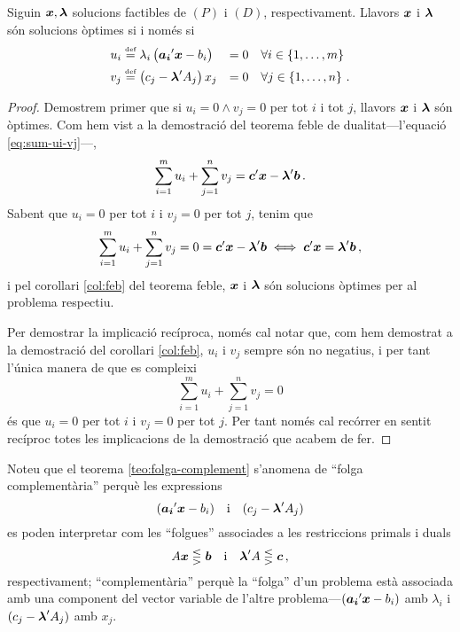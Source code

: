 \begin{teo}\label{teo:folga-complement}
	Siguin $\boldsymbol{x}, \boldsymbol{\lambda}$ solucions factibles de $\left(P\right)$ i
	$\left(D\right)$, respectivament. Llavors $\boldsymbol{x}$ i $\boldsymbol{\lambda}$ són
	solucions òptimes si i només si
	\begin{alignat*}{2}{}
	u_i &\stackrel{\text{\tiny def}}{=} \lambda_i \left(\boldsymbol{a_i}'\boldsymbol{x} - b_i\right) &= 0 &\quad
	\forall i \in \left\{1, \dots, m\right\} \\
	v_j &\stackrel{\text{\tiny def}}{=} \left(c_j - \boldsymbol{\lambda}'A_j\right) x_j &= 0 &\quad \forall
	j \in \left\{1, \dots, n\right\}\,.
	\end{alignat*}
	\begin{proof}
		Demostrem primer que si $u_i = 0 \land v_j = 0$ per tot $i$ i tot $j$,
		llavors $\boldsymbol{x}$ i $\boldsymbol{\lambda}$ són òptimes. Com hem vist a la 
		demostració del
		teorema feble de dualitat---l'equació \eqref{eq:sum-ui-vj}---, 
		\begin{equation*}
		\sum_{i = 1}^{m} u_i + \sum_{j = 1}^{n} v_j = \boldsymbol{c}'\boldsymbol{x} -
		\boldsymbol{\lambda}'\boldsymbol{b}\,.
		\end{equation*}
		Sabent que $u_i = 0$ per tot $i$ i $v_j = 0$ per tot $j$, tenim que
		\[\sum_{i = 1}^{m} u_i + \sum_{j = 1}^{n} v_j = 0 = \boldsymbol{c}'\boldsymbol{x} -
		\boldsymbol{\lambda}'\boldsymbol{b} \iff \boldsymbol{c}'\boldsymbol{x} = \boldsymbol{\lambda}'\boldsymbol{b}\,,  \] i 
		pel
		corol\lgem lari \ref{col:feb} del teorema feble, $\boldsymbol{x}$ i 
		$\boldsymbol{\lambda}$ 
		són
		solucions òptimes per al problema respectiu.
		
		Per demostrar la implicació recíproca, només cal notar que, com hem
		demostrat a la demostració del corol\lgem lari \ref{col:feb}, $u_i$ i 
		$v_j$ 
		sempre
		són no negatius, i per tant l'única manera de que es compleixi 
		\[\sum_{i=1}^{m}
		u_i + \sum_{j=1}^{n} v_j = 0 \] és que $u_i = 0$ per tot $i$ i $v_j = 
		0$ per tot
		$j$. Per tant només cal recórrer en sentit recíproc totes les 
		implicacions de la
		demostració que acabem de fer.
	\end{proof}
\end{teo}

Noteu que el teorema \ref{teo:folga-complement} s'anomena de ``folga
complementària'' perquè les expressions \[(\boldsymbol{a_i}'\boldsymbol{x}-b_i) \quad
\text{i}\quad (c_j-\boldsymbol{\lambda}'A_j) \] es poden interpretar com les ``folgues''
associades a les restriccions primals i duals \[A\boldsymbol{x} \lesseqgtr \boldsymbol{b} \quad
\text{i}\quad \boldsymbol{\lambda}'A \lesseqgtr \boldsymbol{c}\,,\] respectivament;
``complementària'' perquè la ``folga'' d'un problema està associada amb una
component del vector variable de l'altre problema---$(\boldsymbol{a_i}'\boldsymbol{x}-b_i)$ amb
$\lambda_i$ i $(c_j-\boldsymbol{\lambda}'A_j)$ amb $x_j$.

